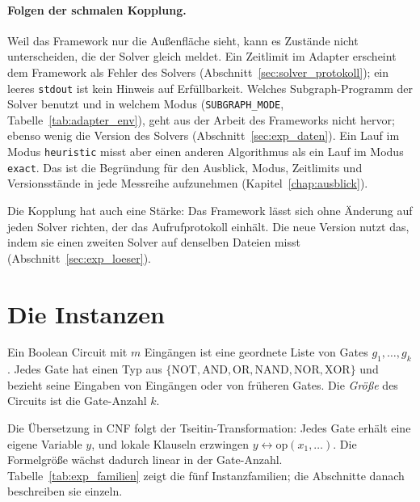 \paragraph{Folgen der schmalen Kopplung.} Weil das Framework nur die Außenfläche sieht, kann es Zustände nicht unterscheiden, die der Solver gleich meldet. Ein Zeitlimit im Adapter erscheint dem Framework als Fehler des Solvers (Abschnitt~\ref{sec:solver_protokoll}); ein leeres \texttt{stdout} ist kein Hinweis auf Erfüllbarkeit. Welches Subgraph-Programm der Solver benutzt und in welchem Modus (\texttt{SUBGRAPH\_MODE}, Tabelle~\ref{tab:adapter_env}), geht aus der Arbeit des Frameworks nicht hervor; ebenso wenig die Version des Solvers (Abschnitt~\ref{sec:exp_daten}). Ein Lauf im Modus \texttt{heuristic} misst aber einen anderen Algorithmus als ein Lauf im Modus \texttt{exact}. Das ist die Begründung für den Ausblick, Modus, Zeitlimits und Versionsstände in jede Messreihe aufzunehmen (Kapitel~\ref{chap:ausblick}).

Die Kopplung hat auch eine Stärke: Das Framework lässt sich ohne Änderung auf jeden Solver richten, der das Aufrufprotokoll einhält. Die neue Version nutzt das, indem sie einen zweiten Solver auf denselben Dateien misst (Abschnitt~\ref{sec:exp_loeser}).

\section{Die Instanzen}
\label{sec:exp_instanzen}

\begin{definition}
	Ein Boolean Circuit mit $m$ Eingängen ist eine geordnete Liste von Gates $g_1,\ldots,g_k$. Jedes Gate hat einen Typ aus $\{\mathrm{NOT},\mathrm{AND},\mathrm{OR},\mathrm{NAND},\mathrm{NOR},\mathrm{XOR}\}$ und bezieht seine Eingaben von Eingängen oder von früheren Gates. Die \emph{Größe} des Circuits ist die Gate-Anzahl $k$.
\end{definition}

Die Übersetzung in CNF folgt der Tseitin-Transformation: Jedes Gate erhält eine eigene Variable $y$, und lokale Klauseln erzwingen $y\leftrightarrow\mathrm{op}(x_1,\ldots)$. Die Formelgröße wächst dadurch linear in der Gate-Anzahl. Tabelle~\ref{tab:exp_familien} zeigt die fünf Instanzfamilien; die Abschnitte danach beschreiben sie einzeln.

